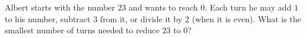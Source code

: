 Albert starts with the number $23$ and wants to reach $0$. Each turn he may add $1$ to his number, subtract $3$ from it, or divide it by $2$ (when it is even). What is the smallest number of turns needed to reduce $23$ to $0$?
